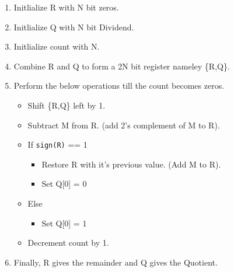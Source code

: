 \documentclass{article}
\begin{document}
\begin{enumerate}
    \item Initlialize R with N bit zeros.
    \item Initlialize Q with N bit Dividend.
    \item Initlialize count with N.
    \item Combine R and Q to form a 2N bit register nameley \{R,Q\}.
    \item Perform the below operations till the count becomes zeros.
          \begin{itemize}
              \item Shift \{R,Q\} left by 1.
              \item Subtract M from R. (add 2's complement of M to R).
              \item If \verb|sign(R)| == 1
                    \begin{itemize}
                        \item Restore R with it's previous value. (Add M to R).
                        \item Set Q[0] = 0
                    \end{itemize}
              \item Else
                    \begin{itemize}
                        \item Set Q[0] = 1
                    \end{itemize}
              \item Decrement count by 1.
          \end{itemize}
    \item Finally, R gives the remainder and Q gives the Quotient.
\end{enumerate}
\end{document}
